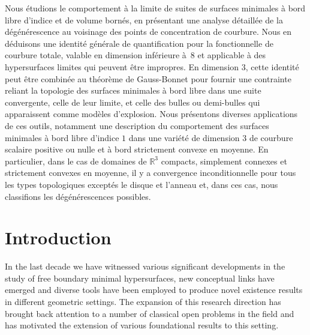 \documentclass[JEP,XML,SOM,Unicode]{cedram}
\newcounter{cas}
\theoremstyle{definition}
\begin{document}


\begin{altabstract}
Nous étudions le comportement à la limite de suites de surfaces minimales à bord libre d'indice et de volume bornés, en présentant une analyse détaillée de la dégénérescence au voisinage des points de concentration de courbure. Nous en déduisons une identité générale de quantification pour la fonctionnelle de courbure totale, valable en dimension inférieure à~$8$ et applicable à des hypersurfaces limites qui peuvent être impropres. En dimension $3$, cette identité peut être combinée au théorème de Gauss-Bonnet pour fournir une contrainte reliant la topologie des surfaces minimales à bord libre dans une suite convergente, celle de leur limite, et celle des bulles ou demi-bulles qui apparaissent comme modèles d'explosion. Nous présentons diverses applications de ces outils, notamment une description du comportement des surfaces minimales à bord libre d'indice $1$ dans une variété de dimension $3$ de courbure scalaire positive ou nulle et à bord strictement convexe en moyenne. En particulier, dans le cas de domaines de $\mathbb{R}^3$ compacts, simplement connexes et strictement convexes en moyenne, il y a convergence inconditionnelle pour tous les types topologiques exceptés le disque et l'anneau et, dans ces cas, nous classifions les dégénérescences possibles.
\end{altabstract}
\maketitle
\newpage
\tableofcontents
\mainmatter

\section{Introduction}\label{sec:intro}

In the last decade we have witnessed various significant developments in the study of free boundary minimal hypersurfaces, new conceptual links have emerged and diverse tools have been employed to produce novel existence results in different geometric settings. The expansion of this research direction has brought back attention to a number of classical open problems in the field and has motivated the extension of various foundational results to this setting.
\end{document}
